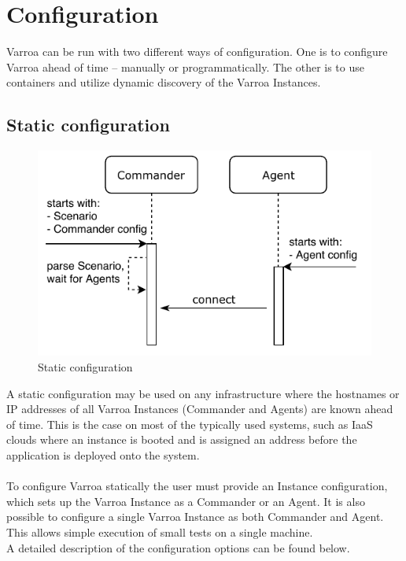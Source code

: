 \section{Configuration}
Varroa can be run with two different ways of configuration.
One is to configure Varroa ahead of time -- manually or programmatically.
The other is to use containers and utilize dynamic discovery of the Varroa Instances.

\subsection{Static configuration}
\begin{figure}[h]
\begin{center}
\includegraphics[scale=1]{Resources/PDF/ExecutionStaticInit}
\caption{Static configuration}
\label{pic:staticExecution}
\end{center}
\end{figure}

A static configuration may be used on any infrastructure where the hostnames or IP addresses of all Varroa Instances (Commander and Agents) are known ahead of time. This is the case on most of the typically used systems, such as IaaS clouds where an instance is booted and is assigned an address before the application is deployed onto the system.\\
\\
To configure Varroa statically the user must provide an Instance configuration, which sets up the Varroa Instance as a Commander or an Agent.
It is also possible to configure a single Varroa Instance as both Commander and Agent.
This allows simple execution of small tests on a single machine.
\\
A detailed description of the configuration options can be found below.

